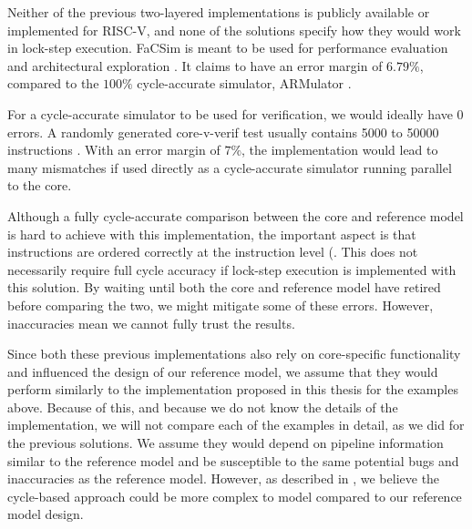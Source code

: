 Neither of the previous two-layered implementations is publicly available or implemented for RISC-V, and none of the solutions specify how they would work in lock-step execution.
FaCSim is meant to be used for performance evaluation and architectural exploration \cite{leeFaCSimFastCycleAccurate2008}. It claims to have an error margin of $6.79 \%$, compared to the $100 \%$ cycle-accurate simulator, ARMulator \cite{leeFaCSimFastCycleAccurate2008}.

For a cycle-accurate simulator to be used for verification, we would ideally have 0 errors. A randomly generated core-v-verif test usually contains 5000 to 50000 instructions \cite{openhwgroupOpenhwgroupCorevverif2023}. With an error margin of $7 \%$, the implementation would lead to many mismatches if used directly as a cycle-accurate simulator running parallel to the core. 




Although a fully cycle-accurate comparison between the core and reference model is hard to achieve with this implementation, the important aspect is that instructions are ordered correctly at the instruction level (. This does not necessarily require full cycle accuracy if lock-step execution is implemented with this solution. By waiting until both the core and reference model have retired before comparing the two, we might mitigate some of these errors. However, inaccuracies mean we cannot fully trust the results.

Since both these previous implementations also rely on core-specific functionality and influenced the design of our reference model, we assume that they would perform similarly to the implementation proposed in this thesis for the examples above.
Because of this, and because we do not know the details of the implementation, we will not compare each of the examples in detail, as we did for the previous solutions.
We assume they would depend on pipeline information similar to the reference model and be susceptible to the same potential bugs and inaccuracies as the reference model. However, as described in , we believe the cycle-based approach could be more complex to model compared to our reference model design.


